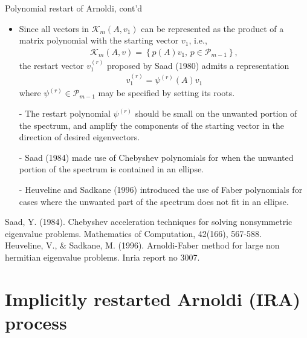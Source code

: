 \documentclass[t,usepdftitle=false]{beamer}
\begin{document}
\begin{frame}{Polynomial restart of Arnoldi, cont'd}
\begin{itemize}
\item Since all vectors in $\mathcal{K}_m(A,v_1)$ can be represented as the product of a matrix polynomial with the starting vector $v_1$, i.e.,
\begin{align*}
\mathcal{K}_m(A,v)=
\left\{p(A)v_1,\,p\in\mathcal{P}_{m-1}\right\},
\end{align*}
the restart vector $v_1^{(r)}$ proposed by Saad (1980) admits a representation
\begin{align*}
v_1^{(r)}=\psi^{(r)}(A)v_1
\end{align*}
where $\psi^{(r)}\in\mathcal{P}_{m-1}$ may be specified by setting its roots.
\item[-] The restart polynomial $\psi^{(r)}$ should be small on the unwanted portion of the spectrum, and amplify the components of the starting vector in the direction of
desired eigenvectors.
\item[-] Saad (1984) made use of Chebyshev polynomials for when the unwanted portion of the spectrum is contained in an ellipse.
\item[-] Heuveline and Sadkane (1996) introduced the use of Faber polynomials for cases where the unwanted part of the spectrum does not fit in an ellipse.
\end{itemize}
\smallskip
\tiny{Saad, Y. (1984). Chebyshev acceleration techniques for solving nonsymmetric eigenvalue problems. Mathematics of Computation, 42(166), 567-588.}\tinyskip\\
\tiny{Heuveline, V., \& Sadkane, M. (1996). Arnoldi-Faber method for large non hermitian eigenvalue problems. Inria report no 3007.}
\end{frame}

\section{Implicitly restarted Arnoldi (IRA) process}
\end{document}

